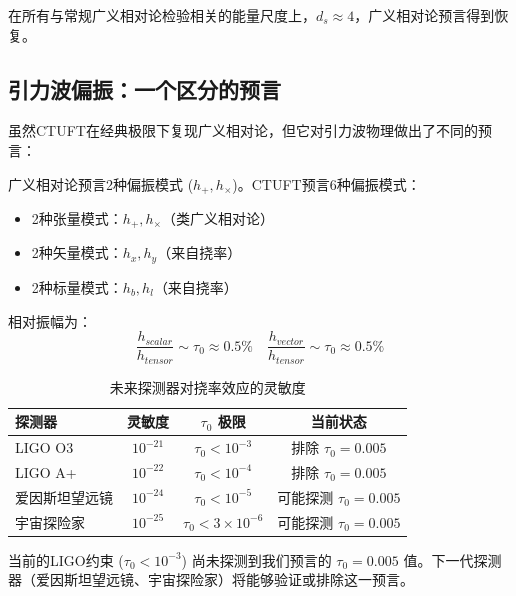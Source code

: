 在所有与常规广义相对论检验相关的能量尺度上，$d_s \approx 4$，广义相对论预言得到恢复。

\subsection{引力波偏振：一个区分的预言}

虽然CTUFT在经典极限下复现广义相对论，但它对引力波物理做出了不同的预言：

\begin{theorem}[引力波偏振模式]
广义相对论预言2种偏振模式 ($h_+, h_\times$)。CTUFT预言6种偏振模式：
\begin{itemize}
    \item 2种张量模式：$h_+, h_\times$（类广义相对论）
    \item 2种矢量模式：$h_x, h_y$（来自挠率）
    \item 2种标量模式：$h_b, h_l$（来自挠率）
\end{itemize}
\end{theorem}

相对振幅为：
\begin{equation}
    \frac{h_{scalar}}{h_{tensor}} \sim \tau_0 \approx 0.5\%
    \quad
    \frac{h_{vector}}{h_{tensor}} \sim \tau_0 \approx 0.5\%
\end{equation}

\begin{table}[htbp]
\centering
\caption{未来探测器对挠率效应的灵敏度}
\begin{tabular}{@{}lccc@{}}
\hline
探测器 & 灵敏度 & $\tau_0$ 极限 & 当前状态 \\
\hline
LIGO O3 & $10^{-21}$ & $\tau_0 < 10^{-3}$ & 排除 $\tau_0 = 0.005$ \\
LIGO A+ & $10^{-22}$ & $\tau_0 < 10^{-4}$ & 排除 $\tau_0 = 0.005$ \\
爱因斯坦望远镜 & $10^{-24}$ & $\tau_0 < 10^{-5}$ & 可能探测 $\tau_0 = 0.005$ \\
宇宙探险家 & $10^{-25}$ & $\tau_0 < 3\times 10^{-6}$ & 可能探测 $\tau_0 = 0.005$ \\
\hline
\end{tabular}
\label{tab:gw_detectors}
\end{table}

\begin{remark}[实验前景]
当前的LIGO约束 ($\tau_0 < 10^{-3}$) 尚未探测到我们预言的 $\tau_0 = 0.005$ 值。下一代探测器（爱因斯坦望远镜、宇宙探险家）将能够验证或排除这一预言。
\end{remark}

